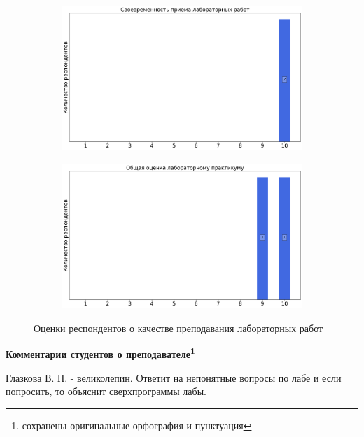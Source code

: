 \begin{figure}[H]
\begin{subfigure}[b]{0.45\textwidth}
                    \centering
                    \includegraphics[width=\textwidth]{images/3 course/Общая физика - квантовая физика/labniks-marks-Глазков В.Н.-2.png}
                \end{subfigure}
                \begin{subfigure}[b]{0.45\textwidth}
                    \centering
                    \includegraphics[width=\textwidth]{images/3 course/Общая физика - квантовая физика/labniks-marks-Глазков В.Н.-3.png}
                \end{subfigure}	
                \caption{Оценки респондентов о качестве преподавания лабораторных работ}
            \end{figure}

            \textbf{Комментарии студентов о преподавателе\protect\footnote{сохранены оригинальные орфография и пунктуация}}
                \begin{commentbox} 
                    Глазкова В. Н. - великолепин. Ответит на непонятные вопросы по лабе и если попросить, то объяснит сверхпрограммы лабы.  
                \end{commentbox} 

